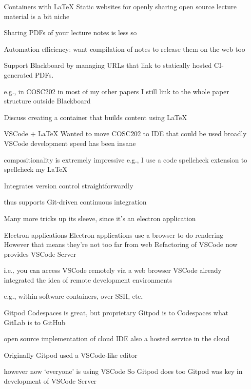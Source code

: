\documentclass[aspectratio=169,t]{beamer}
\begin{document}
\begin{dframe}{Containers with \LaTeX}
  \1 Static websites for openly sharing open source lecture material is a bit niche

  \1 Sharing PDFs of your lecture notes is less so
  
  \2 Automation efficiency: want compilation of notes to release them on the web too

  \1 Support Blackboard by managing URLs that link to statically hosted CI-generated PDFs.

  \2 e.g., in COSC202
  \2 in most of my other papers I still link to the whole paper structure outside Blackboard

  \1 Discuss creating a container that builds content using \LaTeX{}
\end{dframe}


\begin{dframe}{VSCode + \LaTeX}
  \1 Wanted to move COSC202 to IDE that could be used broadly
  \1 VSCode development speed has been insane
  
  \2 compositionality is extremely impressive
  \2 e.g., I use a code spellcheck extension to spellcheck my \LaTeX{}

  \1 Integrates version control straightforwardly
  
  \2 thus supports Git-driven continuous integration
  
  \1 Many more tricks up its sleeve, since it's an electron application
\end{dframe}

\begin{dframe}{Electron applications}
  \1 Electron applications use a browser to do rendering
  \1 However that means they're not too far from web
  \1 Refactoring of VSCode now provides VSCode Server
  
  \2 i.e., you can access VSCode remotely via a web browser
  \2 VSCode already integrated the idea of remote development environments

  \3 e.g., within software containers, over SSH, etc.
\end{dframe}

\begin{dframe}{Gitpod}
  \1 Codespaces is great, but proprietary
  \1 Gitpod is to Codespaces what GitLab is to GitHub
  
  \2 open source implementation of cloud IDE
  \2 also a hosted service in the cloud

  \1 Originally Gitpod used a VSCode-like editor

  \2 however now `everyone' is using VSCode
  \2 So Gitpod does too
  \2 Gitpod was key in development of VSCode Server
\end{dframe}
\end{document}
